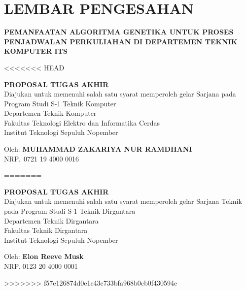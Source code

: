 \chapter*{LEMBAR PENGESAHAN}

\thispagestyle{empty}

\begin{center}
  \textbf{PEMANFAATAN ALGORITMA GENETIKA UNTUK PROSES PENJADWALAN PERKULIAHAN DI DEPARTEMEN TEKNIK KOMPUTER ITS}
\end{center}

\begingroup
\small

<<<<<<< HEAD
  \begin{center}
    \textbf{PROPOSAL TUGAS AKHIR} \\
    Diajukan untuk memenuhi salah satu syarat memperoleh gelar Sarjana pada \\
    Program Studi S-1 Teknik Komputer\\
    Departemen Teknik Komputer \\
    Fakultas Teknologi Elektro dan Informatika Cerdas \\
    Institut Teknologi Sepuluh Nopember
  \end{center}

  \begin{center}
    Oleh: \textbf{MUHAMMAD ZAKARIYA NUR RAMDHANI} \\
    NRP.\ 0721 19 4000 0016
  \end{center}
=======
\begin{center}
  \textbf{PROPOSAL TUGAS AKHIR} \\
  Diajukan untuk memenuhi salah satu syarat memperoleh gelar
  Sarjana Teknik pada
  Program Studi S-1 Teknik Dirgantara \\
  Departemen Teknik Dirgantara \\
  Fakultas Teknik Dirgantara \\
  Institut Teknologi Sepuluh Nopember
\end{center}

\begin{center}
  Oleh: \textbf{Elon Reeve Musk} \\
  NRP. 0123 20 4000 0001
\end{center}
>>>>>>> f57e126874d0e1c43c733bfa968b0cb0f430594e

